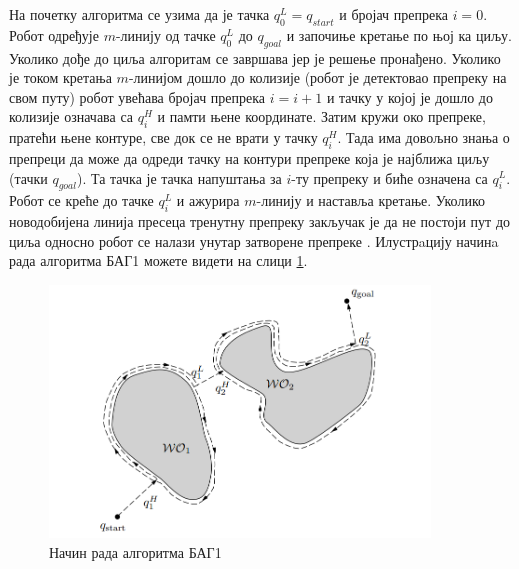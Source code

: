 \documentclass[12pt,oneside]{memoir}
\theoremstyle{remark}
\begin{document}
На почетку алгоритма се узима да је тачка $q_0^L = q_{start}$ и бројач препрека $i=0$. Робот одређује $m$-линију од тачке  $q_0^L$ до $q_{goal}$ и започиње кретање по њој ка циљу. Уколико дође до циља алгоритам се завршава јер је решење пронађено. Уколико је током кретања $m$-линијом дошло до колизије (робот је детектовао препреку на свом путу) робот увећава бројач препрека $i=i+1$ и тачку у којој је дошло до колизије означава са $q_i^H$ и памти њене координате. Затим кружи око препреке, пратећи њене контуре, све док се не врати у тачку $q_i^H$. Тада има довољно знања о препреци да може да одреди тачку на контури препреке која је најближа циљу (тачки $q_{goal}$). Та тачка је тачка напуштања за $i$-ту препреку и биће означена са $q_i^L$. Робот се креће до тачке $q_i^L$ и ажурира $m$-линију и наставља кретање. Уколико новодобијена линија пресеца тренутну препреку закључак је да не постоји пут до циља односно робот се налази унутар затворене препреке \cite{principlesofrobotmotion}. Илустрaцију начинa рада алгоритма БАГ1 можете видети на слици \ref{fig:bug1}.

\begin{figure}[!ht]
\centering
\includegraphics[width=0.9\textwidth]{slike/bug1.png}
\caption{Начин рада алгоритма БАГ1}
\label{fig:bug1}
\end{figure}
\end{document}
